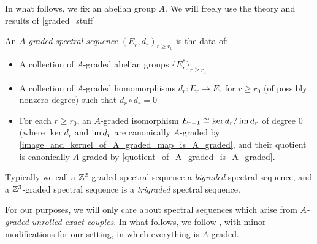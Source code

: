 \documentclass[../main.tex]{subfiles}
\begin{document}
In what follows, we fix an abelian group $A$. We will freely use the theory and results of \autoref{graded_stuff}

\begin{definition}
    An \emph{$A$-graded spectral sequence} $(E_r,d_r)_{r\geq r_0}$ is the data of:\begin{itemize}
        \item A collection of $A$-graded abelian groups $\{E_r^{*}\}_{r\geq r_0}$
        \item A collection of $A$-graded homomorphisms $d_r:E_r\to E_r$ for $r\ge r_0$ (of possibly nonzero degree) such that $d_r\circ d_r=0$ 
        \item For each $r\geq r_0$, an $A$-graded isomorphism $E_{r+1}\cong\ker d_r/\operatorname{im} d_r$ of degree $0$ (where $\ker d_r$ and $\operatorname{im} d_r$ are canonically $A$-graded by \autoref{image_and_kernel_of_A_graded_map_is_A_graded}, and their quotient is canonically $A$-graded by \autoref{quotient_of_A_graded_is_A_graded}.
    \end{itemize}
\end{definition}

Typically we call a $\mathbb{Z}^2$-graded spectral sequence a \emph{bigraded} spectral sequence, and a $\mathbb{Z}^3$-graded spectral sequence is a \emph{trigraded} spectral sequence.


For our purposes, we will only care about spectral sequences which arise from \emph{$A$-graded unrolled exact couples}. In what follows, we follow \cite{Boardman_1999}, with minor modifications for our setting, in which everything is $A$-graded.
\end{document}
